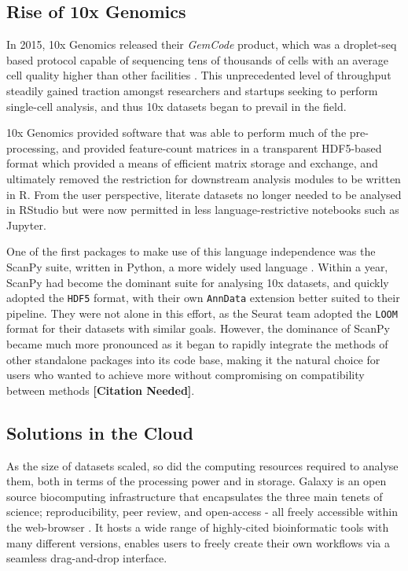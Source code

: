 \documentclass[a4paper,num-refs]{oup-contemporary}
\newcommand{\prog}[1]{\textit{#1}}
\newcommand{\fileformat}[1]{\texttt{#1}}
\newcommand{\citeneed}{{\bf\tiny [Citation Needed]}}
\begin{document}

\subsection{Rise of 10x Genomics}
In 2015, 10x Genomics released their \prog{GemCode} product, which was a droplet-seq based protocol capable of sequencing tens of thousands of cells with an average cell quality higher than other facilities \citep{vickovic2016massive}. This unprecedented level of throughput steadily gained traction amongst researchers and startups seeking to perform single-cell analysis, and thus 10x datasets began to prevail in the field.

10x Genomics provided software that was able to perform much of the pre-processing, and provided feature-count matrices in a transparent HDF5-based format which provided a means of efficient matrix storage and exchange, and ultimately removed the restriction for downstream analysis modules to be written in R. From the user perspective, literate datasets no longer needed to be analysed in RStudio but were now permitted in less language-restrictive notebooks such as Jupyter\citep{allaire2012rstudio,kluyver2016jupyter}.

One of the first packages to make use of this language independence was the ScanPy suite, written in Python, a more widely used language \citep{stackoverflow2019,wolf2018scanpy}. Within a year, ScanPy had become the dominant suite for analysing 10x datasets, and quickly adopted the \fileformat{HDF5} format, with their own \fileformat{AnnData} extension better suited to their pipeline. They were not alone in this effort, as the Seurat team adopted the \fileformat{LOOM} format for their datasets with similar goals. However, the dominance of ScanPy became much more pronounced as it began to rapidly integrate the methods of other standalone packages into its code base, making it the natural choice for users who wanted to achieve more without compromising on compatibility between methods \citeneed.

\subsection{Solutions in the Cloud}

As the size of datasets scaled, so did the computing resources required to analyse them, both in terms of the processing power and in storage. Galaxy is an open source biocomputing infrastructure that encapsulates the three main tenets of science; reproducibility, peer review, and open-access - all freely accessible within the web-browser \citep{afgan2016galaxy}. It hosts a wide range of highly-cited bioinformatic tools with many different versions, enables users to freely create their own workflows via a seamless drag-and-drop interface.
\end{document}
